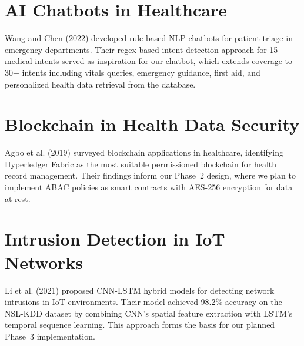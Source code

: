 \documentclass[12pt,a4paper]{report}
\begin{document}
\section{AI Chatbots in Healthcare}
Wang and Chen (2022) developed rule-based NLP chatbots for patient triage in emergency departments. Their regex-based intent detection approach for 15 medical intents served as inspiration for our chatbot, which extends coverage to 30+ intents including vitals queries, emergency guidance, first aid, and personalized health data retrieval from the database.

\section{Blockchain in Health Data Security}
Agbo et al. (2019) surveyed blockchain applications in healthcare, identifying Hyperledger Fabric as the most suitable permissioned blockchain for health record management. Their findings inform our Phase~2 design, where we plan to implement ABAC policies as smart contracts with AES-256 encryption for data at rest.

\section{Intrusion Detection in IoT Networks}
Li et al. (2021) proposed CNN-LSTM hybrid models for detecting network intrusions in IoT environments. Their model achieved 98.2\% accuracy on the NSL-KDD dataset by combining CNN's spatial feature extraction with LSTM's temporal sequence learning. This approach forms the basis for our planned Phase~3 implementation.
\end{document}

